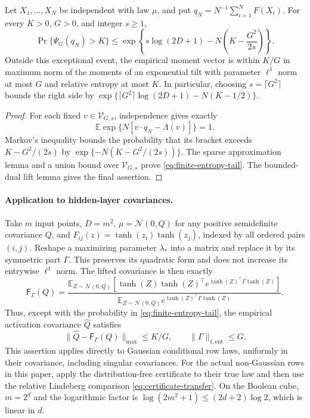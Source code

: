 \begin{proposition}
\label{prop:finite-entropy-certificate}
Let $X_1,\ldots,X_N$ be independent with law $\mu$, and put
$q_N=N^{-1}\sum_{i=1}^N F(X_i)$. For every $K>0$, $G>0$, and integer
$s\geq1$,
\begin{equation}\label{eq:finite-entropy-tail}
 \Pr\{\Psi_G(q_N)>K\}
 \leq\exp\left\{s\log(2D+1)
          -N\left(K-\frac{G^2}{2s}\right)\right\}.
\end{equation}
Outside this exceptional event, the empirical moment vector is within
$K/G$ in maximum norm of the moments of an exponential tilt with parameter
$\ell^1$ norm at most $G$ and relative entropy at most $K$.
In particular, choosing $s=\lceil G^2\rceil$ bounds the right side by
$\exp\{\lceil G^2\rceil\log(2D+1)-N(K-1/2)\}$.
\end{proposition}
\begin{proof}
For each fixed $v\in\mathcal V_{G,s}$, independence gives exactly
\[
 \mathbb E\exp\{N[v\cdot q_N-\Lambda(v)]\}=1.
\]
Markov's inequality bounds the probability that its bracket exceeds
$K-G^2/(2s)$ by $\exp\{-N(K-G^2/(2s))\}$.
The sparse approximation lemma and a union bound over
$\mathcal V_{G,s}$ prove \eqref{eq:finite-entropy-tail}.
The bounded-dual lift lemma gives the final assertion.
\end{proof}

\paragraph{Application to hidden-layer covariances.}
Take $m$ input points, $D=m^2$, $\mu=\mathcal N(0,Q)$ for any positive
semidefinite covariance $Q$, and $F_{ij}(z)=\tanh(z_i)\tanh(z_j)$,
indexed by all ordered pairs $(i,j)$. Reshape a maximizing parameter
$\lambda_*$ into a matrix and replace it by its symmetric part $\Gamma$.
This preserves its quadratic form and does not increase its entrywise
$\ell^1$ norm. The lifted covariance is then exactly
\[
 \mathsf F_\Gamma(Q)=
 \frac{\mathbb E_{Z\sim\mathcal N(0,Q)}
    [\tanh(Z)\tanh(Z)^\top e^{\tanh(Z)^\top\Gamma\tanh(Z)}]}
      {\mathbb E_{Z\sim\mathcal N(0,Q)}
    e^{\tanh(Z)^\top\Gamma\tanh(Z)}}.
\]
Thus, except with the probability in \eqref{eq:finite-entropy-tail}, the
empirical activation covariance $\widehat Q$ satisfies
\[
 \|\widehat Q-\mathsf F_\Gamma(Q)\|_{\max}\leq K/G,
 \qquad \|\Gamma\|_{1,\mathrm{ent}}\leq G.
\]
This assertion applies directly to Gaussian conditional row laws, uniformly
in their covariance, including singular covariances. For the actual
non-Gaussian rows in this paper, apply the distribution-free certificate
to their true law and then use the relative Lindeberg comparison
\eqref{eq:certificate-transfer}. On the Boolean cube,
$m=2^d$ and the logarithmic factor is
$\log(2m^2+1)\leq(2d+2)\log2$, which is linear in $d$.

